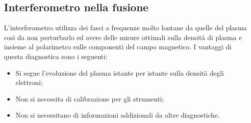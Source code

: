 \documentclass{article}
\begin{document}
\subsection{Interferometro nella fusione}
L'interferometro utilizza dei fasci a frequenze molto lontane da quelle del plasma così da non perturbarlo ed avere delle misure ottimali sulla densità di plasma e insieme al polarimetro sulle componenti del campo magnetico.\newline
I vantaggi di questa diagnostica sono i seguenti:\begin{itemize}
    \item Si segue l'evoluzione del plasma istante per istante sulla densità degli elettroni;
    \item Non si necessita di calibrazione per gli strumenti;
    \item Non si necessitano di informazioni addizionali da altre diagnostiche.
\end{itemize}
\end{document}
